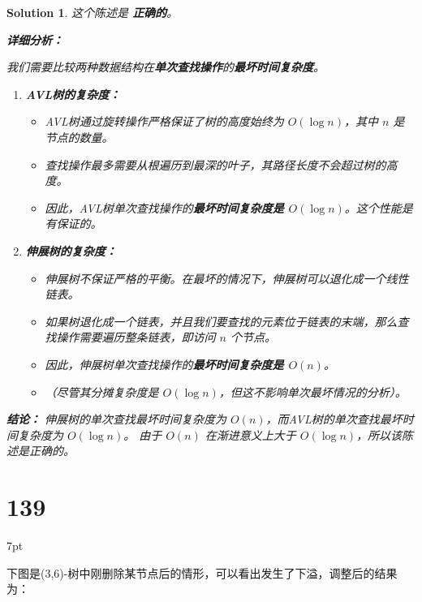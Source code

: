 \documentclass[UTF8]{report}
\newtheorem{solution}{Solution}
\theoremstyle{MyLineTheoremStyle} %
\theoremstyle{MyBlockTheoremStyle} %
\theoremstyle{MySubsubsectionStyle} %
\newenvironment{graybox}{%
        \def\FrameCommand{%
        \hspace{1pt}%
        {\color{gray}\small \vrule width 2pt}%
        {\color{graybox_color}\vrule width 4pt}%
        \colorbox{graybox_color}%
        }%
        \MakeFramed{\advance\hsize-\width\FrameRestore}%
        \noindent\hspace{-4.55pt}%
        \begin{adjustwidth}{}{7pt}%
        \vspace{2pt}\vspace{2pt}%
        }
        {%
        \vspace{2pt}\end{adjustwidth}\endMakeFramed%
        }
\begin{document}
\begin{solution}
这个陈述是 \textbf{正确的}。

\textbf{详细分析：}

我们需要比较两种数据结构在\textbf{单次查找操作}的\textbf{最坏时间复杂度}。

\begin{enumerate}
    \item \textbf{AVL树的复杂度：}
    \begin{itemize}
        \item AVL树通过旋转操作严格保证了树的高度始终为 $O(\log n)$，其中 $n$ 是节点的数量。
        \item 查找操作最多需要从根遍历到最深的叶子，其路径长度不会超过树的高度。
        \item 因此，AVL树单次查找操作的\textbf{最坏时间复杂度是 $O(\log n)$}。这个性能是有保证的。
    \end{itemize}

    \item \textbf{伸展树的复杂度：}
    \begin{itemize}
        \item 伸展树不保证严格的平衡。在最坏的情况下，伸展树可以退化成一个线性链表。
        \item 如果树退化成一个链表，并且我们要查找的元素位于链表的末端，那么查找操作需要遍历整条链表，即访问 $n$ 个节点。
        \item 因此，伸展树单次查找操作的\textbf{最坏时间复杂度是 $O(n)$}。
        \item （尽管其分摊复杂度是 $O(\log n)$，但这不影响单次最坏情况的分析）。
    \end{itemize}
\end{enumerate}

\textbf{结论：}
伸展树的单次查找最坏时间复杂度为 $O(n)$，而AVL树的单次查找最坏时间复杂度为 $O(\log n)$。
由于 $O(n)$ 在渐进意义上大于 $O(\log n)$，所以该陈述是正确的。
\end{solution}

\section*{139}
\begin{graybox}
下图是(3,6)-树中刚删除某节点后的情形，可以看出发生了下溢，调整后的结果为：
\begin{center}
\end{center}
\end{graybox}
\end{document}
